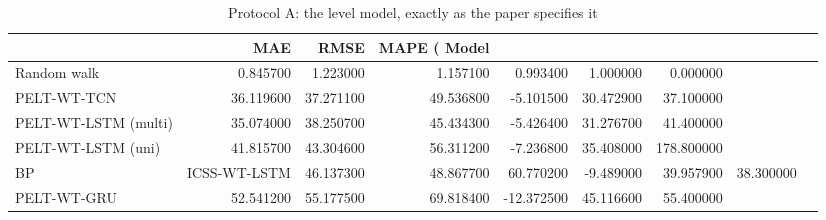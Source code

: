 \begin{table}[htbp]
\caption{Protocol A: the level model, exactly as the paper specifies it}
\label{tab:A_paper}
\begin{tabular}{lrrrrrr}
\toprule
 & MAE & RMSE & MAPE (%
Model &  &  &  &  &  &  \\
\midrule
Random walk & 0.845700 & 1.223000 & 1.157100 & 0.993400 & 1.000000 & 0.000000 \\
PELT-WT-TCN & 36.119600 & 37.271100 & 49.536800 & -5.101500 & 30.472900 & 37.100000 \\
PELT-WT-LSTM (multi) & 35.074000 & 38.250700 & 45.434300 & -5.426400 & 31.276700 & 41.400000 \\
PELT-WT-LSTM (uni) & 41.815700 & 43.304600 & 56.311200 & -7.236800 & 35.408000 & 178.800000 \\
BP&ICSS-WT-LSTM & 46.137300 & 48.867700 & 60.770200 & -9.489000 & 39.957900 & 38.300000 \\
PELT-WT-GRU & 52.541200 & 55.177500 & 69.818400 & -12.372500 & 45.116600 & 55.400000 \\
\bottomrule
\end{tabular}
\end{table}
